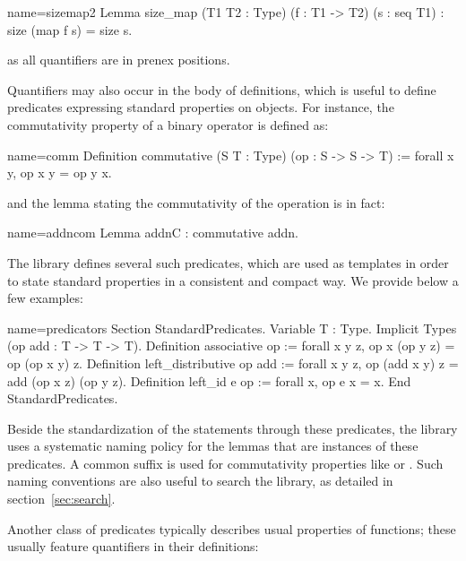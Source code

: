 \begin{coq}{name=sizemap2}{}
Lemma size_map (T1 T2 : Type) (f : T1 -> T2) (s : seq T1) :
  size (map f s) = size s.
\end{coq}

as all quantifiers are in prenex positions.

Quantifiers may also occur in the body of definitions, which is
useful to define predicates expressing standard properties on
objects. For instance, the commutativity property of a binary operator
is defined as:

\begin{coq}{name=comm}{}
Definition commutative (S T : Type) (op : S -> S -> T) :=
  forall x y, op x y = op y x.
\end{coq}
and the lemma stating the commutativity of the  operation is
in fact:

\begin{coq}{name=addncom}{}
Lemma addnC : commutative addn.
\end{coq}
The \mcbMC{} library defines several such predicates, which are used
as templates in order to state standard properties in a consistent and
compact way. We provide below a few examples:

\begin{coq}{name=predicators}{}
Section StandardPredicates.
Variable T : Type.
Implicit Types (op add : T -> T -> T).
Definition associative op := forall x y z, op x (op y z) = op (op x y) z.
Definition left_distributive op add :=
  forall x y z, op (add x y) z = add (op x z) (op y z).
Definition left_id e op := forall x, op e x = x.
End StandardPredicates.
\end{coq}

Beside the standardization of the statements through these
predicates, the \mcbMC{} library uses a systematic naming policy for the lemmas
that are instances of these predicates. A common suffix  is
used for commutativity properties like  or .
Such naming conventions are also useful to search the library, as detailed
in section~\ref{sec:search}.

Another class of predicates typically
describes usual properties of functions; these usually feature
quantifiers in their definitions:

